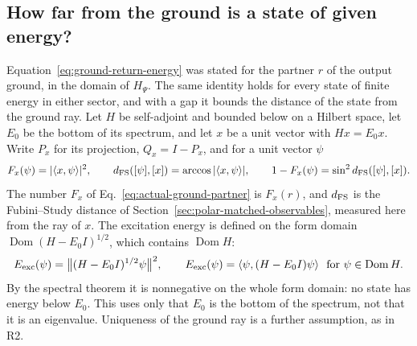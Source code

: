 \subsection{How far from the ground is a state of given energy?}
\label{subsec:fidelity-energy}

Equation~\eqref{eq:ground-return-energy} was stated for the partner $r$ of the output ground, in the domain of $H_\Psi$. The same identity holds for every state of finite energy in either sector, and with a gap it bounds the distance of the state from the ground ray. Let $H$ be self-adjoint and bounded below on a Hilbert space, let $E_0$ be the bottom of its spectrum, and let $x$ be a unit vector with $Hx=E_0x$. Write $P_x$ for its projection, $Q_x=I-P_x$, and for a unit vector $\psi$
\begin{equation}
 F_x(\psi)=|\langle x,\psi\rangle|^2,\qquad
 d_{\rm FS}([\psi],[x])=\arccos|\langle x,\psi\rangle|,\qquad
 1-F_x(\psi)=\sin^2d_{\rm FS}([\psi],[x]).
 \label{eq:fidelity-energy-distance}
\end{equation}
The number $F_x$ of Eq.~\eqref{eq:actual-ground-partner} is $F_x(r)$, and $d_{\rm FS}$ is the Fubini--Study distance of Section~\ref{sec:polar-matched-observables}, measured here from the ray of $x$. The excitation energy is defined on the form domain $\operatorname{Dom}(H-E_0I)^{1/2}$, which contains $\operatorname{Dom}H$:
\begin{equation}
 E_{\rm exc}(\psi)=\bigl\|(H-E_0I)^{1/2}\psi\bigr\|^2,
 \qquad E_{\rm exc}(\psi)=\langle\psi,(H-E_0I)\psi\rangle\ \text{ for }\psi\in\operatorname{Dom}H .
 \label{eq:fidelity-energy-form}
\end{equation}
By the spectral theorem it is nonnegative on the whole form domain: no state has energy below $E_0$. This uses only that $E_0$ is the bottom of the spectrum, not that it is an eigenvalue. Uniqueness of the ground ray is a further assumption, as in R2.

